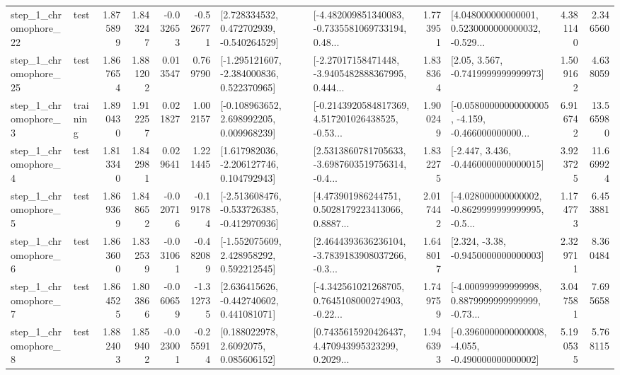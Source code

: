 \begin{tabular}{llrrrrllrlrr}
    step\_1\_chromophore\_22 &      test &      1.875899 &    1.843247 &     -0.032653 & -0.526771 &    [2.728334532, 0.472702939, -0.540264529] &  [-4.482009851340083, -0.7335581069733194, 0.48... &       1.773951 &  [4.048000000000001, 0.5230000000000032, -0.529... &            4.381140 &          2.346560 \\
    step\_1\_chromophore\_25 &      test &      1.867654 &    1.881202 &      0.013547 &  0.769790 &   [-1.295121607, -2.384000836, 0.522370965] &  [-2.27017158471448, -3.9405482888367995, 0.444... &       1.838364 &                 [2.05, 3.567, -0.7419999999999973] &            1.509162 &          4.638059 \\
     step\_1\_chromophore\_3 &  training &      1.890430 &    1.912257 &      0.021827 &  1.002157 &    [-0.108963652, 2.698992205, 0.009968239] &  [-0.2143920584817369, 4.517201026438525, -0.53... &       1.900249 &  [-0.05800000000000005, -4.159, -0.466000000000... &            6.916742 &         13.565980 \\
     step\_1\_chromophore\_4 &      test &      1.813340 &    1.842981 &      0.029641 &  1.221445 &    [1.617982036, -2.206127746, 0.104792943] &  [2.5313860781705633, -3.6987603519756314, -0.4... &       1.832275 &               [-2.447, 3.436, -0.4460000000000015] &            3.923725 &         11.669924 \\
     step\_1\_chromophore\_5 &      test &      1.869369 &    1.848652 &     -0.020716 & -0.191784 &  [-2.513608476, -0.533726385, -0.412970936] &  [4.473901986244751, 0.5028179223413066, 0.8887... &       2.017442 &  [-4.028000000000002, -0.8629999999999995, -0.5... &            1.174773 &          6.453881 \\
     step\_1\_chromophore\_6 &      test &      1.863600 &    1.832539 &     -0.031061 & -0.482089 &    [-1.552075609, 2.428958292, 0.592212545] &  [2.4644393636236104, -3.7839183908037266, -0.3... &       1.648017 &                [2.324, -3.38, -0.9450000000000003] &            2.329711 &          8.360484 \\
     step\_1\_chromophore\_7 &      test &      1.864525 &    1.803866 &     -0.060659 & -1.312735 &    [2.636415626, -0.442740602, 0.441081071] &  [-4.342561021268705, 0.7645108000274903, -0.22... &       1.749759 &  [-4.000999999999998, 0.8879999999999999, -0.73... &            3.047581 &          7.695658 \\
     step\_1\_chromophore\_8 &      test &      1.882403 &    1.859402 &     -0.023001 & -0.255914 &       [0.188022978, 2.6092075, 0.085606152] &  [0.7435615920426437, 4.470943995323299, 0.2029... &       1.946393 &  [-0.3960000000000008, -4.055, -0.490000000000002] &            5.190535 &          5.768115 \\

\end{tabular}
